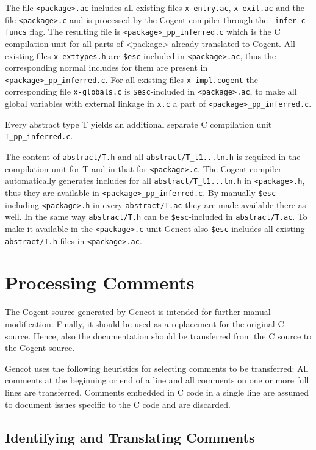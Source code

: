 \documentclass[a4paper]{report}
\newcommand{\code}[1]{\textnormal{\texttt{#1}}}
\begin{document}
The file \code{<package>.ac} includes all existing files 
\code{x-entry.ac}, \code{x-exit.ac} and the file \code{<package>.c} and is processed by the Cogent compiler through the 
\code{--infer-c-funcs} flag. The resulting file is \code{<package>\_pp\_inferred.c} which is the C compilation unit for 
all parts of <package> already translated to Cogent. All existing files \code{x-exttypes.h} are \code{\$esc}-included
in \code{<package>.ac}, thus the corresponding normal includes for them are present in \code{<package>\_pp\_inferred.c}.
For all existing files \code{x-impl.cogent} the corresponding file \code{x-globals.c} is \code{\$esc}-included in 
\code{<package>.ac}, to make all global variables with external linkage in \code{x.c} a part of \code{<package>\_pp\_inferred.c}.

Every abstract type T yields an additional separate C compilation unit \code{T\_pp\_inferred.c}. 

The content of \code{abstract/T.h} and all \code{abstract/T\_t1...tn.h} is required in the compilation unit for T and in 
that for \code{<package>.c}. The Cogent compiler automatically generates includes for all \code{abstract/T\_t1...tn.h} in 
\code{<package>.h}, 
thus they are available in \code{<package>\_pp\_inferred.c}. By manually \code{\$esc}-including \code{<package>.h} in every 
\code{abstract/T.ac} they are made available there as well. In the same way \code{abstract/T.h} can be \code{\$esc}-included
in \code{abstract/T.ac}. To make it available in the \code{<package>.c} unit Gencot also \code{\$esc}-includes all 
existing \code{abstract/T.h} files in \code{<package>.ac}.

\section{Processing Comments}
\label{design-comments}

The Cogent source generated by Gencot is intended for further manual modification. Finally, it should be used as a 
replacement for the original C source. Hence, also the documentation should be transferred from the C source to
the Cogent source.

Gencot uses the following heuristics for selecting comments to be transferred: All comments at the beginning or end 
of a line and all comments on one or more full lines are transferred. Comments embedded in C code in a single line
are assumed to document issues specific to the C code and are discarded.

\subsection{Identifying and Translating Comments}
\end{document}
